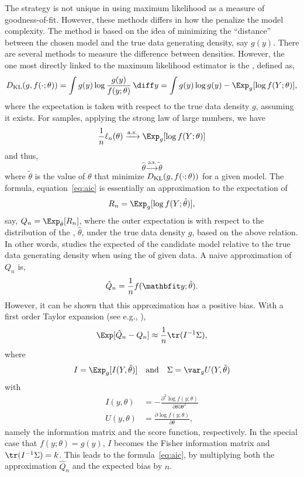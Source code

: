 The \aic strategy is not unique in using maximum likelihood as a measure of
goodness-of-fit. However, these methods differs in how the penalize the model
complexity. The \aic method is based on the idea of minimizing the
``distance'' between the chosen model and the true data generating density,
say $g(y)$. There are several methods to measure the difference between
densities. However, the one most directly linked to the maximum likelihood
estimator is the \kl, defined as,
\begin{equation}
  \dkl(g, f(\cdot;\theta))
  = \int g(y)\log\frac{g(y)}{f(y;\theta)}\intd y
  = \int g(y)\log g(y) - \Exp_g[\log f(Y;\theta)],
\end{equation}
where the expectation is taken with respect to the true data density $g$,
assuming it exists. For \iid samples, applying the strong law of large
numbers, we have
\begin{equation}
  \frac{1}{n}\ell_n(\theta) \xrightarrow{\text{a.s.}}
  \Exp_g[\log f(Y;\theta)]
\end{equation}
and thus,
\begin{equation}
  \hat\theta \xrightarrow{\text{a.s.}} \tilde\theta
\end{equation}
where $\tilde\theta$ is the value of $\theta$ that minimize
$D_{\mathrm{KL}}(g,f(\cdot;\theta))$ for a given model. The \aic formula,
equation~\eqref{eq:aic} is essentially an approximation to the expectation of
\begin{equation}
  R_n = \Exp_g[\log f(Y;\hat\theta)],
\end{equation}
say, $Q_n = \Exp_{\hat\theta}[R_n]$, where the outer expectation is with
respect to the distribution of the \mle, $\hat\theta$, under the true data
density $g$, based on the above relation. In other words, \aic studies the
expected \kl of the candidate model relative to the true data generating
density when using the \mle of given data. A naive approximation of $Q_n$ is,
\begin{equation}
  \hat{Q}_n = \frac{1}{n} f(\data;\hat\theta).
\end{equation}
However, it can be shown that this approximation has a positive bias. With a
first order Taylor expansion (see e.g., \cite[][sec.~2.3]{Claeskens:2008tq}),
\begin{equation}
  \Exp[\hat{Q}_n - Q_n] \approx \frac{1}{n}\tr(I^{-1}\Sigma),
  \label{eq:aic Taylor}
\end{equation}
where
\begin{equation}
  I = \Exp_g[I(Y,\tilde\theta)]\quad\text{and}\quad
  \Sigma = \var_g U(Y,\tilde\theta)
  \label{eq:aic bias}
\end{equation}
with
\begin{align}
  I(y,\theta) &=
  -\frac{\partial^2\log f(y;\theta)}{\partial\theta\partial\theta^T}\\
  U(y,\theta) &=
  \frac{\partial\log f(y;\theta)}{\partial\theta},
\end{align}
namely the information matrix and the score function, respectively. In the
special case that $f(y;\theta) = g(y)$, $I$ becomes the Fisher information
matrix and $\tr(I^{-1}\Sigma) = k$. This leads to the \aic
formula~\eqref{eq:aic}, by multiplying both the approximation $\hat{Q}_n$ and
the expected bias by $n$.

